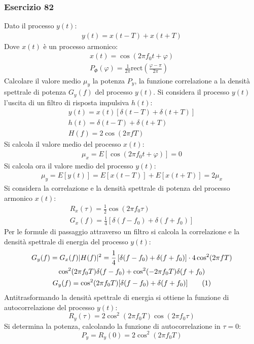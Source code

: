 \documentclass{article}
\newcommand{\rect}{\mathrm{rect}}
\newcommand{\tageq}{\tag{\stepcounter{equation}\theequation}}
\begin{document}
\subsubsection*{Esercizio 82}

Dato il processo $y(t)$:
\begin{gather*}
    y(t)=x(t-T)+x(t+T)
\end{gather*}
Dove $x(t)$ è un processo armonico:
\begin{gather*}
    x(t)=\displaystyle\cos\left(2\pi f_0t+\varphi\right)\\
    P_{\Phi}(\varphi)=\displaystyle\frac{1}{2\pi}\rect\left(\frac{\varphi-\pi}{2\pi}\right)
\end{gather*}
Calcolare il valore medio $\mu_y$ la potenza $P_y$, la funzione correlazione a la densità spettrale di potenza $G_y(f)$ del processo $y(t)$. 
Si considera il processo $y(t)$ l'uscita di un filtro di risposta impulsiva $h(t)$:
\begin{gather*}
    y(t)=x(t)[\delta(t-T)+\delta(t+T)]\\
    h(t)=\delta(t-T)+\delta(t+T)\\
    H(f)=2\cos\left(2\pi fT\right)
\end{gather*}
Si calcola il valore medio del processo $x(t)$:
\begin{gather*}
    \mu_x=E[\cos(2\pi f_0t+\varphi)]=0
\end{gather*}
Si calcola ora il valore medio del processo $y(t)$:
\begin{gather}
    \mu_y=E[y(t)]=E[x(t-T)]+E[x(t+T)]=2\mu_x
\end{gather}
Si considera la correlazione e la densità spettrale di potenza del processo armonico $x(t)$:
\begin{gather*}
    R_x(\tau)=\displaystyle\frac{1}{2}\cos(2\pi f_0\tau)\\
    G_x(f)=\displaystyle\frac{1}{4}\left[\delta(f-f_0)+\delta(f+f_0)\right]
\end{gather*}
Per le formule di passaggio attraverso un filtro si calcola la correlazione e la densità spettrale di energia del processo $y(t)$:
\begin{gather*}
    G_y(f)=G_x(f)|H(f)|^2=\displaystyle\frac{1}{4}\left[\delta(f-f_0)+\delta(f+f_0)\right]\cdot4\cos^2(2\pi fT)\\
    \cos^2(2\pi f_0T)\delta(f-f_0)+\cos^2(-2\pi f_0T)\delta(f+f_0)\\
    G_y(f)=\cos^2(2\pi f_0T)[\delta(f-f_0)+\delta(f+f_0)]\tageq
\end{gather*}
Antitrasformando la densità spettrale di energia si ottiene la funzione di autocorrelazione del processo $y(t)$:
\begin{equation}
    R_y(\tau)=2\cos^2(2\pi f_0T)\cos(2\pi f_0\tau)
\end{equation}
Si determina la potenza, calcolando la funzione di autocorrelazione in $\tau=0$:
\begin{equation}
    P_y=R_y(0)=2\cos^2(2\pi f_0T)
\end{equation}

\clearpage
\end{document}
